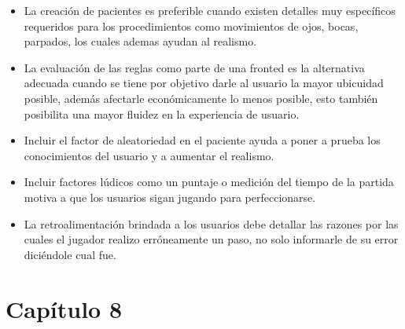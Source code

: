 \begin{itemize}
\item La creación de pacientes es preferible cuando existen detalles muy específicos
  requeridos para los procedimientos como movimientos de ojos, bocas, parpados,
  los cuales ademas ayudan al realismo. 
\item La evaluación de las reglas como parte de una fronted es la alternativa
  adecuada cuando se tiene por objetivo darle al usuario la mayor ubicuidad
  posible, además afectarle económicamente lo menos posible, esto también
  posibilita una mayor fluidez en la experiencia de usuario.
\item Incluir el factor de aleatoriedad en el paciente ayuda a poner a prueba los
  conocimientos del usuario y a aumentar el realismo.
\item Incluir factores lúdicos como un puntaje o medición del tiempo de la partida
  motiva a que los usuarios sigan jugando para perfeccionarse.
\item La retroalimentación brindada a los usuarios debe detallar las razones por las
  cuales el jugador realizo erróneamente un paso, no solo informarle de su error
  diciéndole cual fue. 
\end{itemize}

\section{Capítulo 8}



